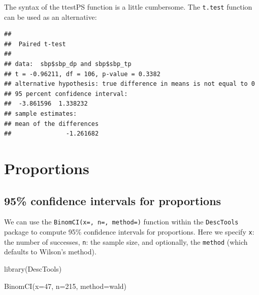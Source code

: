 \documentclass[
]{memoir}
\newenvironment{Shaded}{\begin{snugshade}}{\end{snugshade}}
\newcommand{\AttributeTok}[1]{\textcolor[rgb]{0.77,0.63,0.00}{#1}}
\newcommand{\ConstantTok}[1]{\textcolor[rgb]{0.00,0.00,0.00}{#1}}
\newcommand{\DecValTok}[1]{\textcolor[rgb]{0.00,0.00,0.81}{#1}}
\newcommand{\FunctionTok}[1]{\textcolor[rgb]{0.00,0.00,0.00}{#1}}
\newcommand{\NormalTok}[1]{#1}
\newcommand{\SpecialCharTok}[1]{\textcolor[rgb]{0.00,0.00,0.00}{#1}}
\newcommand{\StringTok}[1]{\textcolor[rgb]{0.31,0.60,0.02}{#1}}
\begin{document}
The syntax of the ttestPS function is a little cumbersome. The \texttt{t.test} function can be used as an alternative:

\begin{Shaded}
\end{Shaded}

\begin{verbatim}
## 
##  Paired t-test
## 
## data:  sbp$sbp_dp and sbp$sbp_tp
## t = -0.96211, df = 106, p-value = 0.3382
## alternative hypothesis: true difference in means is not equal to 0
## 95 percent confidence interval:
##  -3.861596  1.338232
## sample estimates:
## mean of the differences 
##               -1.261682
\end{verbatim}

\hypertarget{proportions}{%
\chapter{Proportions}\label{proportions}}

\hypertarget{confidence-intervals-for-proportions}{%
\section{95\% confidence intervals for proportions}\label{confidence-intervals-for-proportions}}

We can use the \texttt{BinomCI(x=,\ n=,\ method=)} function within the \texttt{DescTools} package to compute 95\% confidence intervals for proportions. Here we specify \texttt{x}: the number of successes, \texttt{n}: the sample size, and optionally, the \texttt{method} (which defaults to Wilson's method).

\begin{Shaded}
\begin{Highlighting}[]
\FunctionTok{library}\NormalTok{(DescTools)}

\FunctionTok{BinomCI}\NormalTok{(}\AttributeTok{x=}\DecValTok{47}\NormalTok{, }\AttributeTok{n=}\DecValTok{215}\NormalTok{, }\AttributeTok{method=}\StringTok{\textquotesingle{}wald\textquotesingle{}}\NormalTok{)}
\end{Highlighting}
\end{Shaded}
\end{document}
